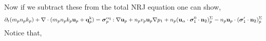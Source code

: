 Now if we subtract these from the total NRJ equation one can show, 
\begin{multline*}
    \partial_t(m_p n_pk_p)
    + \mathbf{\nabla}\cdot(m_pn_p k_p \textbf{u}_p 
    + \textbf{q}_p^\text{k})
    = 
     \bm{\sigma}_p^\text{eq}  :\mathbf{\nabla} \textbf{u}_p
     + n_p v_p \textbf{u}_p \mathbf{\nabla} p_1
     + n_p (\textbf{u}_\alpha \cdot \bm{\sigma}_1^0 \cdot  \textbf{n}_2)^\Sigma_p
     - n_p \textbf{u}_p \cdot (\bm{\sigma}_1' \cdot  \textbf{n}_2)^\Sigma_p
    \\
\end{multline*}
Notice that, 















